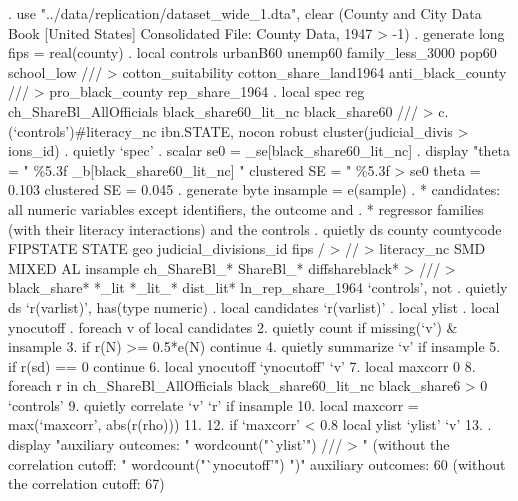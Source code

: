 . use "../data/replication/dataset_wide_1.dta", clear
(County and City Data Book [United States] Consolidated File: County Data, 1947
> -1)
{\smallskip}
. generate long fips = real(county)
{\smallskip}
. local controls urbanB60 unemp60 family_less_3000 pop60 school_low ///
>     cotton_suitability cotton_share_land1964 anti_black_county ///
>     pro_black_county rep_share_1964
{\smallskip}
. local spec reg ch_ShareBl_AllOfficials black_share60_lit_nc black_share60 ///
>     c.(`controls')\#literacy_nc ibn.STATE, nocon robust cluster(judicial_divis
> ions_id)
{\smallskip}
. quietly `spec'
{\smallskip}
. scalar se0 = _se[black_share60_lit_nc]
{\smallskip}
. display "theta = " \%5.3f _b[black_share60_lit_nc] "   clustered SE = " \%5.3f 
> se0
theta = 0.103   clustered SE = 0.045
{\smallskip}
. generate byte insample = e(sample)
{\smallskip}
. * candidates: all numeric variables except identifiers, the outcome and
. * regressor families (with their literacy interactions) and the controls
. quietly ds county countycode FIPSTATE STATE geo judicial_divisions_id fips  /
> //
>     literacy_nc SMD MIXED AL insample ch_ShareBl_* ShareBl_* diffshareblack* 
> ///
>     black_share* *_lit *_lit_* dist_lit* ln_rep_share_1964 `controls', not
{\smallskip}
. quietly ds `r(varlist)', has(type numeric)
{\smallskip}
. local candidates `r(varlist)'
{\smallskip}
. local ylist
{\smallskip}
. local ynocutoff
{\smallskip}
. foreach v of local candidates {\lbr}
  2.     quietly count if missing(`v') \& insample
  3.     if r(N) >= 0.5*e(N) continue
  4.     quietly summarize `v' if insample
  5.     if r(sd) == 0 continue
  6.     local ynocutoff `ynocutoff' `v'
  7.     local maxcorr 0
  8.     foreach r in ch_ShareBl_AllOfficials black_share60_lit_nc black_share6
> 0 `controls' {\lbr}
  9.         quietly correlate `v' `r' if insample
 10.         local maxcorr = max(`maxcorr', abs(r(rho)))
 11.     {\rbr}
 12.     if `maxcorr' < 0.8 local ylist `ylist' `v'
 13. {\rbr}
{\smallskip}
. display "auxiliary outcomes: " wordcount("`ylist'") ///
>     "   (without the correlation cutoff: " wordcount("`ynocutoff'") ")"
auxiliary outcomes: 60   (without the correlation cutoff: 67)
{\smallskip}
